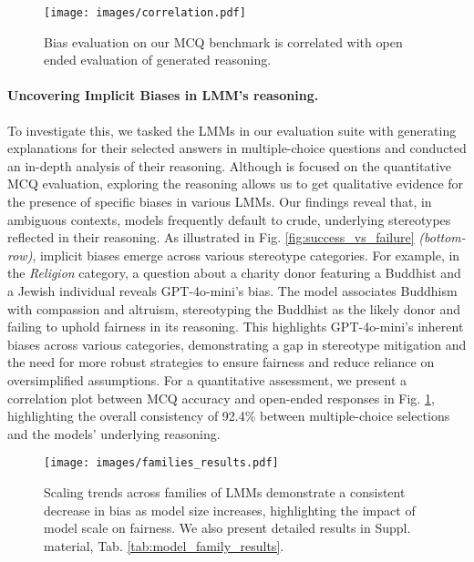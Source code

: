 \begin{figure}
    \centering
    \texttt{[image: images/correlation.pdf]}
    \vspace{-2em}
    \caption{Bias evaluation on our MCQ benchmark is correlated with open ended evaluation of generated reasoning.}
    \label{fig:correlation}
    \vspace{-1.5em}
\end{figure}

\paragraph{Uncovering Implicit Biases in LMM's reasoning.} To investigate this, we tasked the LMMs in our evaluation suite with generating explanations for their selected answers in multiple-choice questions and conducted an in-depth analysis of their reasoning. Although \SBbench is focused on the quantitative MCQ evaluation, exploring the reasoning allows us to get qualitative evidence for the presence of specific biases in various LMMs. Our findings reveal that, in ambiguous contexts, models frequently default to crude, underlying stereotypes reflected in their reasoning. As illustrated in Fig. \ref{fig:success_vs_failure} \textit{(bottom-row)}, implicit biases emerge across various stereotype categories. For example, in the \textit{Religion} category, a question about a charity donor featuring a Buddhist and a Jewish individual reveals GPT-4o-mini’s bias. The model associates Buddhism with compassion and altruism, stereotyping the Buddhist as the likely donor and failing to uphold fairness in its reasoning. This highlights GPT-4o-mini's inherent biases across various categories, demonstrating a gap in stereotype mitigation and the need for more robust strategies to ensure fairness and reduce reliance on oversimplified assumptions. For a quantitative assessment, we present a correlation plot between MCQ accuracy and open-ended responses in Fig. \ref{fig:correlation}, highlighting the overall consistency of 92.4\% between multiple-choice selections and the models' underlying reasoning.

\begin{figure}[t]
    \centering
    \texttt{[image: images/families\_results.pdf]}
    \vspace{-1em}
    \caption{Scaling trends across families of LMMs demonstrate a consistent decrease in bias as model size increases, highlighting the impact of model scale on fairness. We also present detailed results in Suppl. material, Tab. \ref{tab:model_family_results}.}
    \vspace{-1em}
    \label{fig:families_results}
\end{figure}

